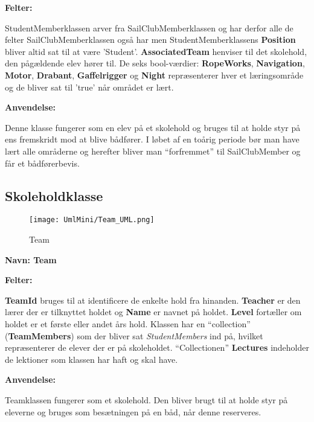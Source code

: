 \textbf{Felter:}

StudentMemberklassen arver fra SailClubMemberklassen og har derfor alle de felter SailClubMemberklassen også har men StudentMemberklassens \textbf{Position} bliver altid sat til at være 'Student'. \textbf{AssociatedTeam} henviser til det skolehold, den pågældende elev hører til. De seks bool-værdier: \textbf{RopeWorks}, \textbf{Navigation}, \textbf{Motor}, \textbf{Drabant}, \textbf{Gaffelrigger} og \textbf{Night} repræsenterer hver et læringsområde og de bliver sat til 'true' når området er lært. 

\textbf{Anvendelse:}

Denne klasse fungerer som en elev på et skolehold og bruges til at holde styr på ens fremskridt mod at blive bådfører. I løbet af en toårig periode bør man have lært alle områderne og herefter bliver man ``forfremmet'' til SailClubMember og får et bådførerbevis.


\subsection*{Skoleholdklasse}

\begin{wrapfigure}{R}{0.5\textwidth}
    \label{img:Team}
    \begin{center}
        \texttt{[image: UmlMini/Team\_UML.png]}
    \end{center}
    \caption{Team}
\end{wrapfigure}

\textbf{Navn: Team}

\textbf{Felter:}

\textbf{TeamId} bruges til at identificere de enkelte hold fra hinanden. \textbf{Teacher} er den lærer der er tilknyttet holdet og \textbf{Name} er navnet på holdet. \textbf{Level} fortæller om holdet er et første eller andet års hold. Klassen har en ``collection'' (\textbf{TeamMembers}) som der bliver sat \textit{StudentMembers} ind på, hvilket repræsenterer de elever der er på skoleholdet. ``Collectionen'' \textbf{Lectures} indeholder de lektioner som klassen har haft og skal have. 

\textbf{Anvendelse:}

Teamklassen fungerer som et skolehold. Den bliver brugt til at holde styr på eleverne og bruges som besætningen på en båd, når denne reserveres. 


